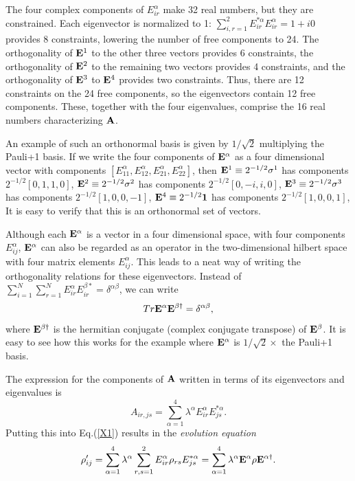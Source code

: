 \documentclass[aps,pra,amssymb, amsfonts,amsmath,showpacs, superscriptaddress,12pt]{revtex4}
\begin{document}
The four complex components of
$E_{ir}^{\alpha}$ make 32 real numbers, but they are constrained. Each eigenvector is normalized to 1: $\sum_{i,r=1}^{2}E^{*\alpha}_{ir}E^{\alpha}_{ir}=1+i0$ provides 8 constraints, lowering the number of free components to 24. The orthogonality of ${\bf E}^{1}$ to the other three vectors provides 6 constraints, the orthogonality of ${\bf E}^{2}$ to the remaining two vectors provides 4 constraints, and the orthogonality of ${\bf E}^{3}$ to ${\bf E}^{4}$ provides two constraints. Thus, there are 12 constraints on the 24 free components, so the eigenvectors contain 12 free components.  These, together with the four eigenvalues, comprise the 16 real numbers characterizing ${\bf A}$.


An example of such an orthonormal basis is given by $1/\sqrt{2}$ multiplying the  Pauli+1 basis.    If we write the four components 
of ${\bf E}^{\alpha}$ as a four dimensional vector with components $[E_{11}^{\alpha}, E_{12}^{\alpha},E_{21}^{\alpha},E_{22}^{\alpha}]$, then 
 ${\bf E}^{1}\equiv2^{-1/2}{\bf \sigma}^{1}$ has components $2^{-1/2}[0,1,1,0]$, ${\bf E}^{2}\equiv2^{-1/2}{\bf \sigma}^{2}$ has components $2^{-1/2}[0,-i,i,0]$, ${\bf E}^{3}\equiv2^{-1/2}{\bf \sigma}^{3}$ has components $2^{-1/2}[1,0,0,-1]$, ${\bf E}^{4}\equiv2^{-1/2}{\bf 1}$ has components $2^{-1/2}[1,0,0,1]$,  It is easy to verify that this is an orthonormal set of vectors. 

Although each ${\bf E}^{\alpha}$ is a vector in a four dimensional space, with  four components  $E_{ij}^{\alpha}$,  
 ${\bf E}^{\alpha}$ can also 
be regarded as an operator in the two-dimensional hilbert  space with four matrix elements $E_{ij}^{\alpha}$.  This leads to a neat way of writing the orthogonality relations for these eigenvectors. Instead of 
$\sum_{i=1}^{N}\sum_{r=1}^{N}E_{ir}^{\alpha}E_{ir}^{\beta*}=\delta^{\alpha\beta}$, we can write 
\[
Tr{\bf E}^{\alpha}{\bf E}^{\beta\dagger} =\delta^{\alpha\beta},
\]
\noindent where ${\bf E}^{\beta\dagger}$ is the hermitian conjugate (complex conjugate transpose) of ${\bf E}^{\beta}$.  It is easy to see how 
this works for the example where ${\bf E}^{\alpha}$ is $1/\sqrt{2}\times$ the Pauli+1 basis.   




The expression for the components of ${\bf A}$ written in terms of its eigenvectors and eigenvalues is 
\[
A_{ir,js}=\sum_{\alpha=1}^{4}\lambda^{\alpha}E^{\alpha}_{ir}E^{*\alpha}_{js}.
\]
\noindent Putting this into Eq.(\ref{X1}) results in the \textit{evolution equation}
\[
\rho'_{ij}=\sum_{\alpha=1}^{4}\lambda^{\alpha}\sum_{r,s=1}^{2}E^{\alpha}_{ir}\rho_{rs}E^{*\alpha}_{js}=\sum_{\alpha=1}^{4}\lambda^{\alpha}{\bf E}^{\alpha}{\bf\rho} {\bf E}^{\alpha\dagger}.  
\]
\end{document}
